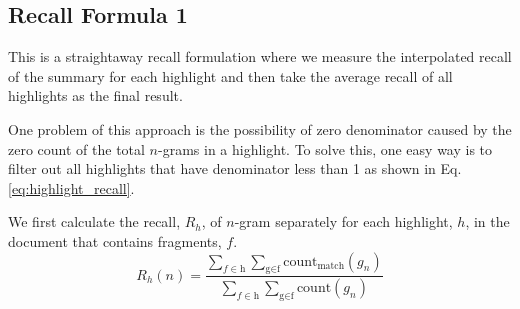 \documentclass[11pt,a4paper]{article}
\newcommand\shashi[1]{{\textcolor{blue}{#1}}}
\begin{document}



\subsection{Recall Formula 1}

This is a straightaway recall formulation where we measure the interpolated recall of the summary for each highlight and then take the average recall of all highlights as the final result. 

One problem of this approach is the possibility of zero denominator caused by the zero count of the total $n$-grams in a highlight. To solve this, one easy way is to filter out all highlights that have denominator less than 1 as shown in Eq. \ref{eq:highlight_recall}.

We first calculate the recall, $R_h$, of $n$-gram separately for each highlight, $h$, in the document that contains fragments, $f$. 
\begin{equation}
\label{eq:highligt_recall_gram}
    R_h (n) = \frac{\displaystyle\sum_{f \in \text{h}}\sum_{\text{g}\in\text{f}} \text{count}_\text{match}(g_n)}{\displaystyle\sum_{f \in \text{h}}\sum_{\text{g}\in\text{f}} \text{count}(g_n)}
\end{equation}
\end{document}
